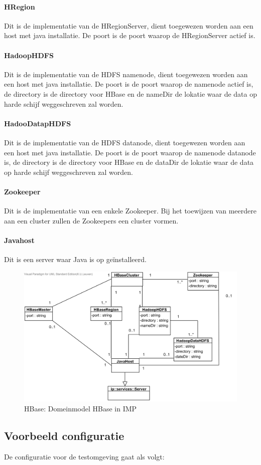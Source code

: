\documentclass[]{article}
\begin{document}
\paragraph{HRegion} Dit is de implementatie van de HRegionServer, dient toegewezen worden aan een host met java installatie. De poort is de poort waarop de HRegionServer actief is. 

\paragraph{HadoopHDFS} Dit is de implementatie van de HDFS namenode, dient toegewezen worden aan een host met java installatie. De poort is de poort waarop de namenode actief is, de directory is de directory voor HBase  en de nameDir de lokatie waar de data op harde schijf weggeschreven zal worden. 

\paragraph{HadooDatapHDFS} Dit is de implementatie van de HDFS datanode, dient toegewezen worden aan een host met java installatie. De poort is de poort waarop de namenode datanode is, de directory is de directory voor HBase en de dataDir de lokatie waar de data op harde schijf weggeschreven zal worden. 

\paragraph{Zookeeper} Dit is de implementatie van een enkele Zookeeper. Bij het toewijzen van meerdere aan een cluster zullen de Zookeepers een cluster vormen. 

\paragraph{Javahost} Dit is een server waar Java is op geïnstalleerd. 

\begin{figure}[ht!]
\centering
\includegraphics[width=\linewidth]{img/HBase-Domeinmodel.png}
\caption{HBase: Domeinmodel HBase in IMP}
\label{fig:imp-hbase-domeinmodel}
\end{figure}

\subsection{Voorbeeld configuratie}
De configuratie voor de testomgeving gaat als volgt: 


\end{document}
